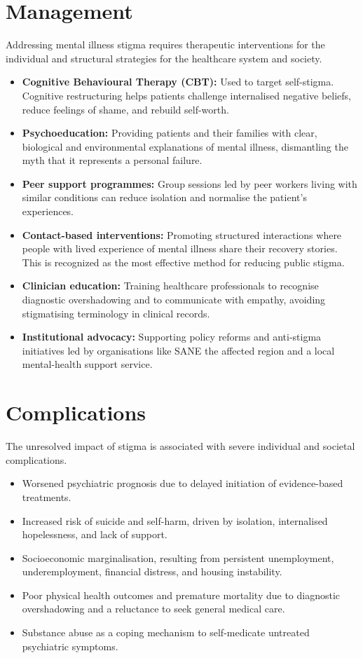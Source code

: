 \section*{Management}
Addressing mental illness stigma requires therapeutic interventions for the individual and structural strategies for the healthcare system and society.
\begin{itemize}
    \item \textbf{Cognitive Behavioural Therapy (CBT):} Used to target self-stigma. Cognitive restructuring helps patients challenge internalised negative beliefs, reduce feelings of shame, and rebuild self-worth.
    \item \textbf{Psychoeducation:} Providing patients and their families with clear, biological and environmental explanations of mental illness, dismantling the myth that it represents a personal failure.
    \item \textbf{Peer support programmes:} Group sessions led by peer workers living with similar conditions can reduce isolation and normalise the patient's experiences.
    \item \textbf{Contact-based interventions:} Promoting structured interactions where people with lived experience of mental illness share their recovery stories. This is recognized as the most effective method for reducing public stigma.
    \item \textbf{Clinician education:} Training healthcare professionals to recognise diagnostic overshadowing and to communicate with empathy, avoiding stigmatising terminology in clinical records.
    \item \textbf{Institutional advocacy:} Supporting policy reforms and anti-stigma initiatives led by organisations like SANE the affected region and a local mental-health support service.
\end{itemize}

\section*{Complications}
The unresolved impact of stigma is associated with severe individual and societal complications.
\begin{itemize}
    \item Worsened psychiatric prognosis due to delayed initiation of evidence-based treatments.
    \item Increased risk of suicide and self-harm, driven by isolation, internalised hopelessness, and lack of support.
    \item Socioeconomic marginalisation, resulting from persistent unemployment, underemployment, financial distress, and housing instability.
    \item Poor physical health outcomes and premature mortality due to diagnostic overshadowing and a reluctance to seek general medical care.
    \item Substance abuse as a coping mechanism to self-medicate untreated psychiatric symptoms.
\end{itemize}

